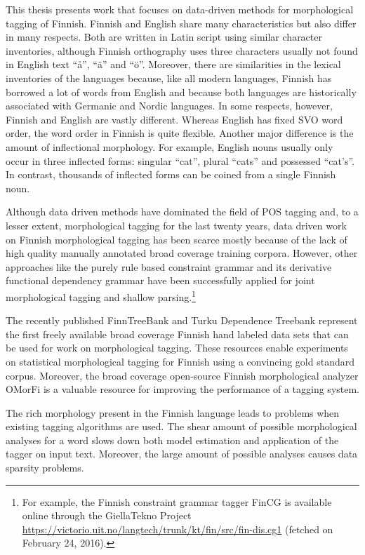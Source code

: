 This thesis presents work that focuses on data-driven methods for
morphological tagging of Finnish. Finnish and English share many
characteristics but also differ in many respects. Both are written in
Latin script using similar character inventories, although Finnish
orthography uses three characters usually not found in English text ``å'',
``ä'' and ``ö''. Moreover, there are similarities in the lexical inventories
of the languages because, like all modern languages, Finnish has
borrowed a lot of words from English and because both languages are
historically associated with Germanic and Nordic languages. In some
respects, however, Finnish and English are vastly different. Whereas
English has fixed SVO word order, the word order in Finnish is quite
flexible. Another major difference is the amount of inflectional
morphology. For example, English nouns usually only occur in three inflected forms: singular ``cat'', plural ``cats'' and possessed ``cat's''. In contrast,
thousands of inflected forms can be coined from a single Finnish noun.

Although data driven methods have dominated the field of POS tagging
and, to a lesser extent, morphological tagging for the last twenty
years, data driven work on Finnish morphological tagging has been
scarce mostly because of the lack of high quality manually annotated
broad coverage training corpora. However, other approaches like the
purely rule based constraint grammar \citep{Karlsson1995} and its
derivative functional dependency grammar \citep{Tapanainen1997} have
been successfully applied for joint morphological tagging and
shallow parsing.\footnote{For example, the Finnish constraint grammar
  tagger FinCG is available online through the GiellaTekno Project
  \citep{gt}
  \url{https://victorio.uit.no/langtech/trunk/kt/fin/src/fin-dis.cg1}
  (fetched on February 24, 2016).}

The recently published FinnTreeBank \citep{Voutilainen2011} and Turku
Dependence Treebank \citep{Haverinen2013} represent the first freely
available broad coverage Finnish hand labeled data sets that can be
used for work on morphological tagging. These resources enable
experiments on statistical morphological tagging for Finnish using a
convincing gold standard corpus. Moreover, the broad coverage
open-source Finnish morphological analyzer OMorFi \citep{Pirinen2011}
is a valuable resource for improving the performance of a tagging
system.

The rich morphology present in the Finnish language leads to problems
when existing tagging algorithms are used. The shear amount of
possible morphological analyses for a word slows down both model
estimation and application of the tagger on input text. Moreover, the
large amount of possible analyses causes data sparsity
problems. %

